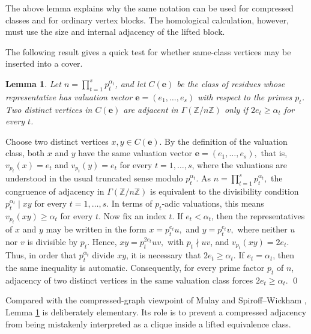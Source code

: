 \documentclass[12pt]{article}
\newtheorem{lemma}[theorem]{Lemma}
\theoremstyle{definition}
\renewenvironment{proof}{{\bf \noindent Proof.}}{\qed}
\begin{document}
\medskip

The above lemma explains why the same notation can be used for compressed classes and for ordinary vertex blocks.  The homological calculation, however, must use the size and internal adjacency of the lifted block.



\medskip

\noindent The following result gives a quick test for whether same-class vertices may be inserted into a cover.
\begin{lemma}\label{lem:same-class-test}
Let $n=\prod_{t=1}^s p_t^{\alpha_t}$, and let $C(\mathbf e)$ be the class of residues whose representative has valuation vector $\mathbf e=(e_1,\ldots,e_s)$ with respect to the primes $p_t$.  Two distinct vertices in $C(\mathbf e)$ are adjacent in $\Gamma(\mathbb{Z}/n\mathbb{Z})$ only if $2e_t\geq \alpha_t$ for every $t$.
\end{lemma}

\begin{proof}
	Choose two distinct vertices $x,y\in C(\mathbf e)$.  By the definition of the
	valuation class, both $x$ and $y$ have the same valuation vector
	$ \mathbf e=(e_1,\ldots,e_s), $
	that is,
	$ v_{p_t}(x)=e_t$ and $	v_{p_t}(y)=e_t
	$
	for every $t=1,\ldots,s$, where the valuations are understood in the usual
	truncated sense modulo $p_t^{\alpha_t}$. 
	As
	$
	n=\prod_{t=1}^{s}p_t^{\alpha_t},
	$
	the congruence of adjacency in $\Gamma(\mathbb{Z}/n\mathbb{Z})$ is equivalent to the divisibility condition
	$ p_t^{\alpha_t}\mid xy $ for every $t=1,\ldots,s. $
	In terms of $p_t$-adic valuations, this means
	$ v_{p_t}(xy)\geq \alpha_t $ for every $t. $ Now fix an index $t$.  If $e_t<\alpha_t$, then the representatives of $x$ and
	$y$ may be written in the form
	$ x=p_t^{e_t}u,$ and $ y=p_t^{e_t}v, $
	where neither $u$ nor $v$ is divisible by $p_t$.  Hence,
	$ xy=p_t^{2e_t}uv, $
	with $p_t\nmid uv$, and 
	$ v_{p_t}(xy)=2e_t. $
	Thus, in order that $p_t^{\alpha_t}$ divide $xy$, it is necessary that
	$ 2e_t\geq \alpha_t. $ If $e_t=\alpha_t$, then the same inequality is automatic.  Consequently, for
	every prime factor $p_t$ of $n$, adjacency of two distinct vertices in the
	same valuation class forces
	$ 2e_t\geq \alpha_t. $
\end{proof}

\medskip

Compared with the compressed-graph viewpoint of Mulay \cite{Mulay2002} and Spiroff--Wickham \cite{SpiroffWickham2011}, Lemma \ref{lem:same-class-test} is deliberately elementary.  Its role is to prevent a compressed adjacency from being mistakenly interpreted as a clique inside a lifted equivalence class.
\end{document}
